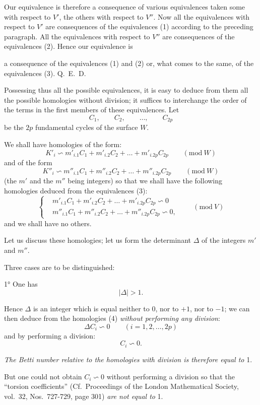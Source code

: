 \documentclass{article}
\begin{document}
Our equivalence is therefore a consequence of various equivalences taken some with respect to $V'$, the others with respect to $V''$. Now all the equivalences with respect to $V'$ are consequences of the equivalences (1) according to the preceding paragraph. All the equivalences with respect to $V''$ are consequences of the equivalences (2). Hence our equivalence is

a consequence of the equivalences (1) and (2) or, what comes to the same, of the equivalences (3). Q.~E.~D.

Possessing thus all the possible equivalences, it is easy to deduce from them all the possible homologies without division; it suffices to interchange the order of the terms in the first members of these equivalences. Let
\[ C_{1}, \qquad C_{2}, \qquad \ldots, \qquad C_{2p} \]
be the $2p$ fundamental cycles of the surface $W$.

We shall have homologies of the form:
\[ K'_{i} \backsim m'_{i.1} C_{1} + m'_{i.2} C_{2} + \ldots + m'_{i.2p} C_{2p} \qquad (\text{mod}\ W) \]
and of the form
\[ K''_{i} \backsim m''_{i.1} C_{1} + m''_{i.2} C_{2} + \ldots + m''_{i.2p} C_{2p} \qquad (\text{mod}\ W) \]
(the $m'$ and the $m''$ being integers) so that we shall have the following homologies deduced from the equivalences (3):
\[ \left\{ \begin{aligned} &m'_{i.1} C_{1} + m'_{i.2} C_{2} + \ldots + m'_{i.2p} C_{2p} \backsim 0\\ &m''_{i.1} C_{1} + m''_{i.2} C_{2} + \ldots + m''_{i.2p} C_{2p} \backsim 0, \end{aligned} \right. \qquad (\text{mod}\ V) \tag{4} \]
and we shall have no others.

Let us discuss these homologies; let us form the determinant $\Delta$ of the integers $m'$ and $m''$.

Three cases are to be distinguished:

1° One has
\[ |\Delta| > 1. \]

Hence $\Delta$ is an integer which is equal neither to 0, nor to $+1$, nor to $-1$; we can then deduce from the homologies (4) \emph{without performing any division}:
\[ \Delta C_{i} \backsim 0 \qquad (i = 1, 2, \ldots, 2p) \]
and by performing a division:
\[ C_{i} \backsim 0. \]

\emph{The Betti number relative to the homologies with division is therefore equal to} 1.

But one could not obtain $C_{i} \backsim 0$ without performing a division so that the ``torsion coefficients'' (Cf.\ Proceedings of the London Mathematical Society, vol.\ 32, Nos.\ 727-729, page 301) \emph{are not equal to} 1.
\end{document}
